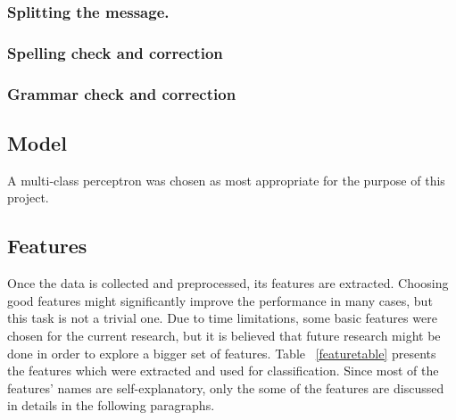 \documentclass{article} %
\begin{document}
\subsubsection*{Splitting the message.}
\subsubsection*{Spelling check and correction}
\subsubsection*{Grammar check and correction}



\subsection{Model}


A multi-class perceptron was chosen as most appropriate for the purpose of this project. 


\subsection{Features \label{sec:features}}

Once the data is collected and preprocessed, its features are extracted. Choosing good features might significantly improve the performance in many cases, but this task is not a trivial one. Due to time limitations, some basic features were chosen for the current research, but it is believed that future research might be done in order to explore a bigger set of features. Table ~\ref{featuretable} presents the features which were extracted and used for classification. Since most of the features' names are self-explanatory, only the some of the features are discussed in details in the following paragraphs.
\end{document}
